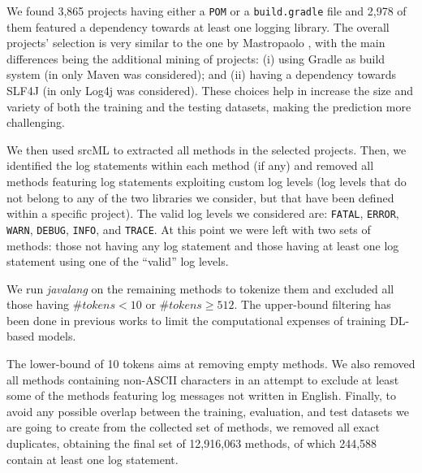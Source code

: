 We found 3,865 projects having either a \texttt{POM} or a \texttt{build.gradle} file and 2,978 of them featured a dependency towards at least one logging library. The overall projects' selection is very similar to the one by Mastropaolo \etal \cite{mastropaolo2022using}, with the main differences being the additional mining of projects: (i) using Gradle as build system (in \cite{mastropaolo2022using} only Maven was considered); and (ii) having a dependency towards SLF4J (in \cite{mastropaolo2022using} only Log4j was considered). These choices help in increase the size and variety of both the training and the testing datasets, making the prediction more challenging. 

We then used srcML \cite{srcml} to extracted all \java methods in the selected projects. Then, we identified the log statements within each method (if any) and removed all methods featuring log statements exploiting custom log levels (\ie log levels that do not belong to any of the two libraries we consider, but that have been defined within a specific project). The valid log levels we considered are: \texttt{FATAL}, \texttt{ERROR}, \texttt{WARN}, \texttt{DEBUG}, \texttt{INFO}, and \texttt{TRACE}. At this point we were left with two sets of methods: those not having any log statement and those having at least one log statement using one of the ``valid'' log levels.

We run \emph{javalang} \cite{javalang} on the remaining methods to tokenize them and excluded all those having $\#tokens < 10$ or $\#tokens \geq 512$. The upper-bound filtering has been done in previous works \cite{ADD_CITATIONS_FROM_OTHER_GROUPS,mastropaolo2021empirical,tufano2021automating,ciniselli2021empirical} to limit the computational expenses of training DL-based models. 

The lower-bound of 10 tokens aims at removing empty methods. We also removed all methods containing non-ASCII characters in an attempt to exclude at least some of the methods featuring log messages not written in English. Finally, to avoid any possible overlap between the training, evaluation, and test datasets we are going to create from the collected set of methods, we removed all exact duplicates, obtaining the final set of 12,916,063 \java methods, of which 244,588 contain at least one log statement. 

